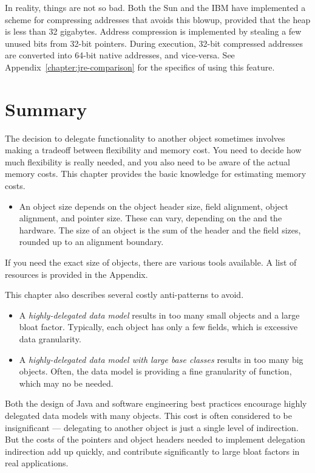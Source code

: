In reality, things are not so bad. Both the Sun and the IBM \jres have
implemented a scheme for compressing addresses that avoids this blowup, provided that the heap is
less than 32 gigabytes. Address compression is implemented by stealing a few unused bits from 32-bit pointers.
During execution, 32-bit compressed addresses are converted into 64-bit native addresses, and vice-versa.
See Appendix~\ref{chapter:jre-comparison} for the specifics of using this
feature.


\section{Summary}

The decision to delegate functionality to another object sometimes involves making a tradeoff between flexibility and memory cost. You need to decide how much flexibility is really needed, and you also need to be aware of the actual memory costs. This chapter provides the basic knowledge for estimating memory costs. 
\begin{itemize}
\item An object size depends on the object header size, field alignment, object
alignment, and pointer size. These can vary, depending on the \jre and the
hardware. The size of an object is the sum of the header and the field
sizes, rounded up to an alignment boundary. 
\end{itemize}
If you need the exact size of objects, there are various tools available. A list of resources is provided in the Appendix.

This chapter also describes several costly anti-patterns to avoid.
\begin{itemize}
\item A \textit{highly-delegated data model} results in too many small objects and a large bloat factor. Typically, each object has only a few fields, which is excessive data granularity.  
\item A \textit{highly-delegated data model with large base classes} results in too many big objects. Often, the data model is providing a fine granularity of function, which may no be needed.
\end{itemize}   

Both the design of Java and software engineering best practices encourage highly delegated data models with many objects. This cost is often considered to be insignificant --- delegating to another object is just a single level of indirection. But the costs of the pointers and object headers needed to implement delegation indirection add up quickly, and contribute significantly to large bloat factors in real applications. 

  

